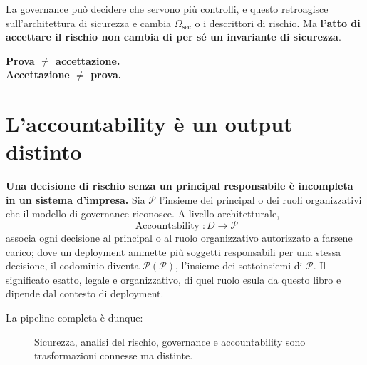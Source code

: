\documentclass[10pt,oneside,openany]{book}
\begin{document}
La governance può decidere che servono più controlli, e questo retroagisce sull'architettura di sicurezza e cambia $\Omega_{\mathrm{sec}}$ o i descrittori di rischio. Ma \textbf{l'atto di accettare il rischio non cambia di per sé un invariante di sicurezza}.

\begin{center}
\sffamily\bfseries
Prova $\neq$ accettazione.\\
Accettazione $\neq$ prova.
\end{center}

\section{L'accountability è un output distinto}

\textbf{Una decisione di rischio senza un principal responsabile è incompleta in un sistema d'impresa.} Sia $\mathcal{P}$ l'insieme dei principal o dei ruoli organizzativi che il modello di governance riconosce. A livello architetturale,
\[
\operatorname{Accountability}:D\rightarrow \mathcal{P}
\]
associa ogni decisione al principal o al ruolo organizzativo autorizzato a farsene carico; dove un deployment ammette più soggetti responsabili per una stessa decisione, il codominio diventa $\mathcal{P}(\mathcal{P})$, l'insieme dei sottoinsiemi di $\mathcal{P}$. Il significato esatto, legale e organizzativo, di quel ruolo esula da questo libro e dipende dal contesto di deployment.

La pipeline completa è dunque:

\begin{figure}[ht]
\centering
{}
\caption{Sicurezza, analisi del rischio, governance e accountability sono trasformazioni connesse ma distinte.}
\end{figure}
\end{document}
